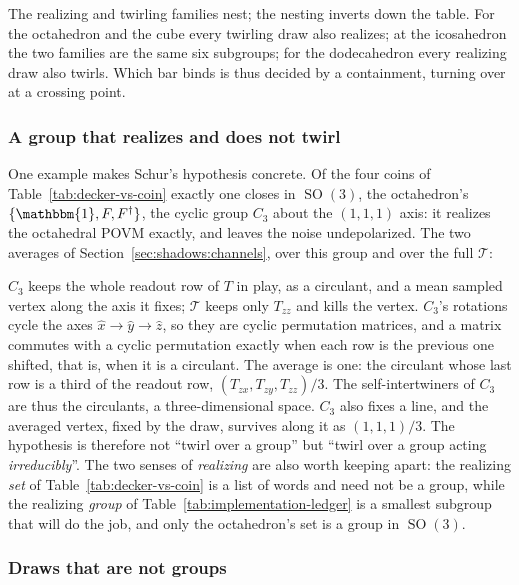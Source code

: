 \documentclass[11pt, oneside, openany]{scrbook}
\DeclareMathOperator{\SO}{SO}
\newcommand{\Id}{\mathbbm{1}}
\newcommand{\Tgroup}{\mathcal{T}}  %
\begin{document}


The realizing and twirling families nest; the nesting inverts down the table. For the octahedron and the cube every twirling draw also realizes; at the icosahedron the two families are the same six subgroups; for the dodecahedron every realizing draw also twirls. Which bar binds is thus decided by a containment, turning over at a crossing point.

\subsubsection{A group that realizes and does not twirl} \label{sec:shadows:bills:coin}

One example makes Schur's hypothesis concrete. Of the four coins of Table~\ref{tab:decker-vs-coin} exactly one closes in $\SO(3)$, the octahedron's $\{\Id, F, F^\dagger\}$, the cyclic group $C_3$ about the $(1,1,1)$ axis: it realizes the octahedral POVM exactly, and leaves the noise undepolarized. The two averages of Section~\ref{sec:shadows:channels}, over this group and over the full $\Tgroup$:



$C_3$ keeps the whole readout row of $T$ in play, as a circulant, and a mean sampled vertex along the axis it fixes; $\Tgroup$ keeps only $T_{zz}$ and kills the vertex. $C_3$'s rotations cycle the axes $\hat{x} \rightarrow \hat{y} \rightarrow \hat{z}$, so they are cyclic permutation matrices, and a matrix commutes with a cyclic permutation exactly when each row is the previous one shifted, that is, when it is a circulant. The average is one: the circulant whose last row is a third of the readout row, $(T_{zx}, T_{zy}, T_{zz})/3$. The self-intertwiners of $C_3$ are thus the circulants, a three-dimensional space. $C_3$ also fixes a line, and the averaged vertex, fixed by the draw, survives along it as $(1,1,1)/3$. The hypothesis is therefore not ``twirl over a group'' but ``twirl over a group acting \textit{irreducibly}''. The two senses of \textit{realizing} are also worth keeping apart: the realizing \textit{set} of Table~\ref{tab:decker-vs-coin} is a list of words and need not be a group, while the realizing \textit{group} of Table~\ref{tab:implementation-ledger} is a smallest subgroup that will do the job, and only the octahedron's set is a group in $\SO(3)$.

\subsubsection{Draws that are not groups} \label{sec:shadows:bills:nongroup}
\end{document}
